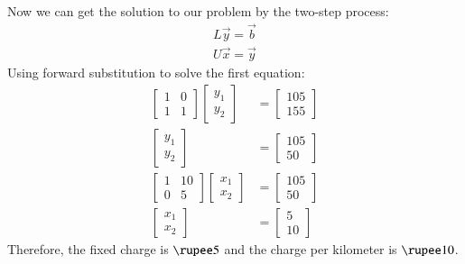 \documentclass[journal]{IEEEtran}
\begin{document}
Now we can get the solution to our problem by the two-step process:
\begin{align}
    L\vec{y} = \vec{b}\\
    U\vec{x} = \vec{y}
\end{align}
Using forward substitution to solve the first equation:
\begin{align}
    \begin{bmatrix}1 & 0\\1 & 1\end{bmatrix}\begin{bmatrix}y_1\\y_2\end{bmatrix} &= \begin{bmatrix}105\\155\end{bmatrix}\\
    \begin{bmatrix}y_1\\y_2\end{bmatrix} &= \begin{bmatrix}105\\50\end{bmatrix}\\
    \begin{bmatrix}1 & 10\\0 & 5\end{bmatrix}\begin{bmatrix}x_1\\x_2\end{bmatrix} &= \begin{bmatrix}105\\50\end{bmatrix}\\
    \begin{bmatrix}x_1\\x_2\end{bmatrix} &= \begin{bmatrix}5\\10\end{bmatrix}
\end{align}
Therefore, the fixed charge is \( \text{\rupee} 5 \) and the charge per kilometer is \( \text{\rupee} 10 \).
\end{document}
